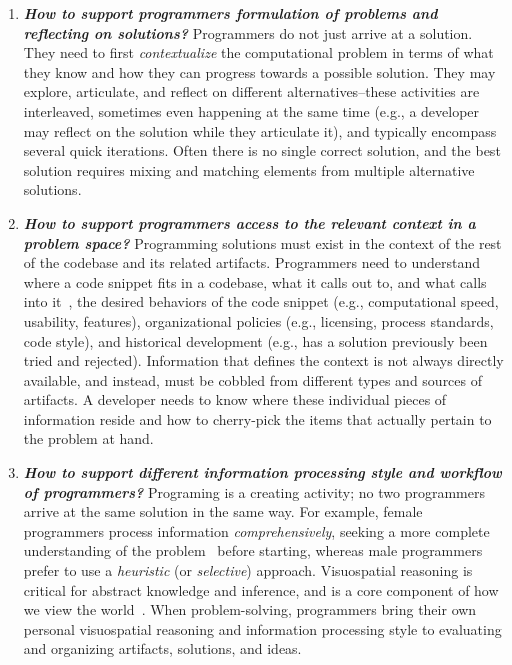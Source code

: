 \begin{enumerate}
	\item \textit{\textbf{How to support programmers formulation of problems and reflecting on solutions?}}
	Programmers do not just arrive at a solution.
	They need to first \textit{contextualize} the computational problem in terms of what they know and how they can progress towards a possible solution.
	They may explore, articulate, and reflect on different alternatives--these activities are interleaved, sometimes even happening at the same time (e.g., a developer may reflect on the solution while they articulate it), and typically encompass several quick iterations.
	Often there is no single correct solution, and the best solution requires mixing and matching elements from multiple alternative solutions.
    
    \item \textit{\textbf{How to support programmers access to the relevant context in a problem space?}}
    Programming solutions must exist in the context of the rest of the codebase and its related artifacts.
    Programmers need to understand where a code snippet fits in a codebase, what it calls out to, and what calls into it~\cite{desouza2008empirical}, the desired behaviors of the code snippet (e.g., computational speed, usability, features), organizational policies (e.g., licensing, process standards, code style), and historical development (e.g., has a solution previously been tried and rejected).
    Information that defines the context is not always directly available, and instead, must be cobbled from different types and sources of artifacts.
    A developer needs to know where these individual pieces of information reside and how to cherry-pick the items that actually pertain to the problem at hand.
    
 	\item \textit{\textbf{How to support different information processing style and workflow of programmers?}}
 	Programing is a creating activity; no two programmers arrive at the same solution in the same way. For example, female programmers process information \textit{comprehensively}, seeking a more complete understanding of the problem~\cite{grigoreanu2012end} before starting, whereas male programmers prefer to use a \textit{heuristic} (or \textit{selective}) approach. 
 	Visuospatial reasoning is critical for abstract knowledge and inference, and is a core component of how we view the world~\cite{tversky2005visuospatial}.
 	When problem-solving, programmers bring their own personal visuospatial reasoning and information processing style to evaluating and organizing artifacts, solutions, and ideas.
  

\end{enumerate}
